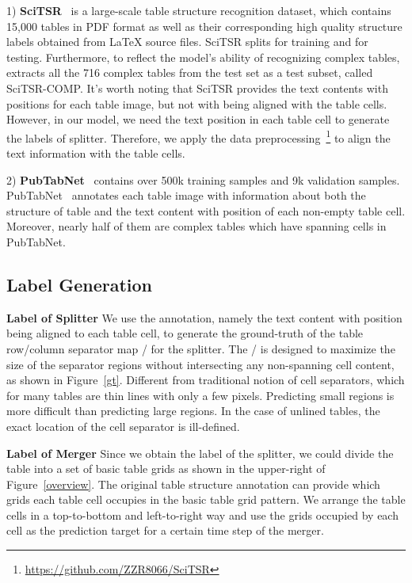 \documentclass[review]{elsarticle}
\begin{document}
1) \textbf{SciTSR}~\cite{GraphTSR} is a large-scale table structure recognition dataset, which contains 15,000 tables in PDF format as well as their corresponding high quality structure labels obtained from LaTeX source files. SciTSR splits  for training and  for testing. Furthermore, to reflect the model’s ability of recognizing complex tables, \cite{GraphTSR} extracts all the 716 complex tables from the test set as a test subset, called SciTSR-COMP. It's worth noting that SciTSR provides the text contents with positions for each table image, but not with being aligned with the table cells. However, in our model, we need the text position in each table cell to generate the labels of splitter. Therefore, we apply the data preprocessing~\footnote{\label{dataprocess}\url{https://github.com/ZZR8066/SciTSR}} to align the text information with the table cells.

2) \textbf{PubTabNet}~\cite{EDD} contains over 500k training samples and 9k validation samples. PubTabNet~\cite{EDD} annotates each table image with information about both the structure of table and the text content with position of each non-empty table cell. Moreover, nearly half of them are complex tables which have spanning cells in PubTabNet.

\subsection{Label Generation}
\textbf{Label of Splitter} We use the annotation, namely the text content with position being aligned to each table cell, to generate the ground-truth of the table row/column separator map / for the splitter. The / is designed to maximize the size of the separator regions without intersecting any non-spanning cell content, as shown in Figure~\ref{gt}. Different from traditional notion of cell separators, which for many tables are thin lines with only a few pixels. Predicting small regions is more difficult than predicting large regions. In the case of unlined tables, the exact location of the cell separator is ill-defined. 

\textbf{Label of Merger} Since we obtain the label of the splitter, we could divide the table into a set of basic table grids as shown in the upper-right of Figure~\ref{overview}. The original table structure annotation can provide which grids each table cell occupies in the basic table grid pattern. We arrange the table cells in a top-to-bottom and left-to-right way and use the grids occupied by each cell as the prediction target for a certain time step of the merger.
\end{document}
